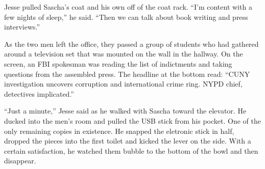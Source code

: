 \documentclass[12pt]{book}
\begin{document}
Jesse pulled Sascha's coat and his own off of the coat rack.  ``I'm content with a few nights of sleep,'' he said.  ``Then we can talk about book writing and press interviews.''

As the two men left the office, they passed a group of students who had gathered around a television set that was mounted on the wall in the hallway.  On the screen, an FBI spokesman was reading the list of indictments and taking questions from the assembled press.  The headline at the bottom read: ``CUNY investigation uncovers corruption and international crime ring.  NYPD chief, detectives implicated.''

``Just a minute,'' Jesse said as he walked with Sascha toward the elevator.  He ducked into the men's room and pulled the USB stick from his pocket.  One of the only remaining copies in existence.  He snapped the eletronic stick in half, dropped the pieces into the first toilet and kicked the lever on the side.  With a certain satisfaction, he watched them bubble to the bottom of the bowl and then disappear.
\end{document}
